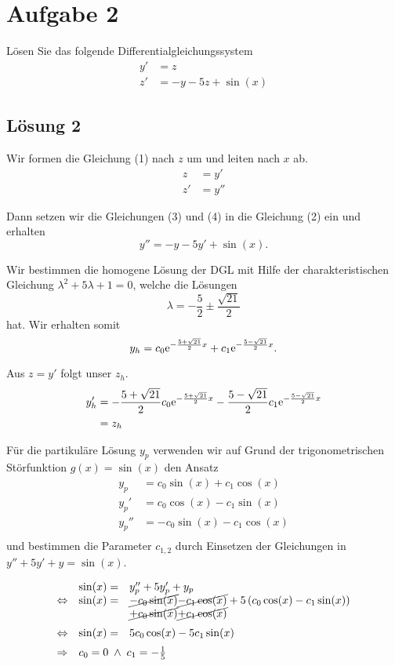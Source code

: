 \documentclass[main.tex]{subfiles}
\begin{document}
\section{Aufgabe 2}
Lösen Sie das folgende Differentialgleichungssystem
\begin{align}
    y' &= z \\
    z' &= -y - 5z + \sin(x)
\end{align}

\subsection{Lösung 2}
Wir formen die Gleichung (1) nach $z$ um und leiten nach $x$ ab.
\begin{align}
    z &= y'  \\
    z' &= y''
\end{align}

Dann setzen wir die Gleichungen (3) und (4) in die Gleichung (2) ein und erhalten
$$
    y'' = -y -5y' +\sin(x).
$$

Wir bestimmen die homogene Lösung der DGL mit Hilfe der charakteristischen Gleichung $\lambda^2 +5\lambda +1 = 0$,
welche die Lösungen
$$
    \lambda = -\frac{5}{2} \pm \frac{\sqrt{21}}{2}
$$
hat.
Wir erhalten somit
$$
    y_h = c_0 \mathrm{e}^{-\frac{5+\sqrt{21}}{2} x} + c_1 \mathrm{e}^{-\frac{5-\sqrt{21}}{2} x}.
$$

Aus $z = y'$ folgt unser $z_h$.
\begin{align*}
    y_h' &= -\frac{5+\sqrt{21}}{2} c_0 \mathrm{e}^{-\frac{5+\sqrt{21}}{2} x} -\frac{5-\sqrt{21}}{2} c_1 \mathrm{e}^{-\frac{5-\sqrt{21}}{2} x} \\
         &= z_h
\end{align*}

Für die partikuläre Lösung $y_p$ verwenden wir auf Grund der trigonometrischen Störfunktion $g(x)=\sin(x)$ den Ansatz
\begin{align*}
    y_p   &= c_0 \sin(x) + c_1 \cos(x)\\
    y_p'  &= c_0 \cos(x) - c_1 \sin(x)\\
    y_p'' &= - c_0 \sin(x) - c_1 \cos(x)\\
\end{align*}
und bestimmen die Parameter $c_{1,2}$ durch Einsetzen der Gleichungen in $y'' + 5y' + y = \sin(x)$.

\begin{equation*}
\begin{array}[pos]{crl}
                & \sin(x) =& y_p'' + 5y_p' + y_p\\
\Leftrightarrow & \sin(x) =& \cancel{- c_0 \sin(x)} \cancel{- c_1 \cos(x)} + 5 \left( c_0 \cos(x) - c_1 \sin(x) \right) \\
                &          & \cancel{+ c_0 \sin(x)} \cancel{+ c_1 \cos(x)}\\[2mm]
\Leftrightarrow & \sin(x) =& 5 c_0 \cos(x) - 5 c_1 \sin(x)\\[2mm]
\Rightarrow     & \multicolumn{2}{l}{c_0 = 0 \;\land\; c_1 = -\frac{1}{5}}
\end{array}
\end{equation*}
\end{document}
